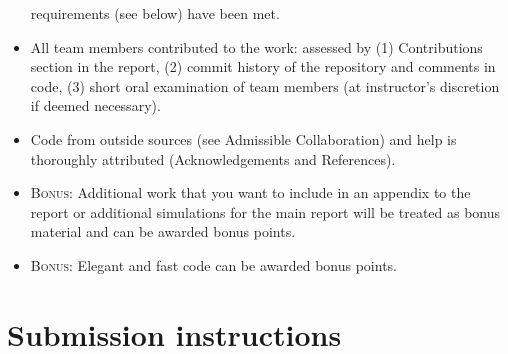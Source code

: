 \documentclass[letterpaper]{scrartcl}
\newcommand{\BONUS}{\textsc{Bonus: }}
\begin{document}
\begin{framed}
\begin{itemize}
    requirements (see below) have been met.
  \item All team members contributed to the work: assessed by (1)
    Contributions section in the report, (2) commit history of the
    repository and comments in code, (3) short oral examination of
    team members (at instructor's discretion if deemed necessary).
  \item Code from outside sources (see Admissible Collaboration) and
    help is thoroughly attributed (Acknowledgements and References).
  \item \BONUS Additional work that you want to include in an appendix to
    the report or additional simulations for the main report will be
    treated as bonus material and can be awarded bonus points.
  \item \BONUS Elegant and fast code can be awarded bonus points.
  \end{itemize}
\end{framed}

\section{Submission instructions}
\end{document}
